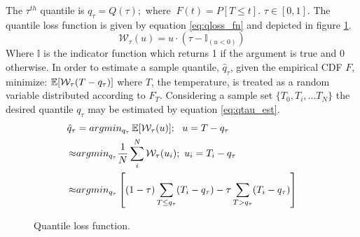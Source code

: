 The $\tau^{th}$ quantile is $q_\tau = Q(\tau); $ where $\ F(t)=P[T \leq t]$.
$\tau \in [0, 1]$. The quantile loss function is given by equation \ref{eq:qloss_fn} and depicted in figure \ref{fig:qloss}.
\begin{equation}
\mathcal W_\tau( u) =  u \cdot (\tau - \mathbb{I}_{( u < 0)})
\label{eq:qloss_fn}
\end{equation}
Where $\mathbb{I}$ is the indicator function which returns 1 if the argument is true and 0 otherwise.
In order to estimate a sample quantile, $\hat q_\tau$, given the empirical CDF $F$, minimize: $\operatorname*{\mathbb{E}}[\mathcal W_\tau(T - q_\tau)]$ where $T$, the temperature, is treated as a random variable distributed according to $F_T$.  Considering a sample set $\{T_0, T_i, \dots T_N \}$ the desired quantile $q_\tau$ may be estimated by equation \ref{eq:qtau_est}.
\begin{equation}
            \left.\begin{aligned}
            \hat q_{\tau} &= argmin_{q_\tau} \operatorname*{\mathbb{E}}[\mathcal W_\tau(u)];\ \  u = T - q_\tau  \\
            \approx & argmin_{q_\tau}  \frac{1}{N} \sum_i^N \mathcal W_\tau(u_i); \ u_i = T_i - q_\tau \\
            \approx & argmin_{q_\tau} \left[ (1-\tau) \sum_{T \leq q_\tau}( T_i - q_\tau ) - \tau \sum_{T > q_\tau} (T_i - q_\tau) \right]
            \end{aligned}\right.
            \label{eq:qtau_est}
\end{equation}


\begin{figure}[H]
	\centering
    \caption[Quantile loss function.]{Quantile loss function.}
\label{fig:qloss}
\end{figure}

